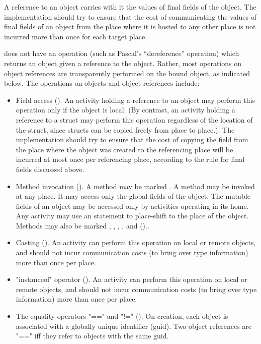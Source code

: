 A reference to an object carries with it the values of final  fields
of the object. The implementation should try to ensure that the cost
of communicating the values of final fields of an object from the
place where it is hosted to any other place is not incurred more than
once for each target place.

{}\Xten{} does not have an operation (such as Pascal's ``dereference''
operation) which returns an object given a reference to the
object. Rather, most operations on object references are transparently
performed on the bound object, as indicated below. The operations on
objects and object references include:
\begin{itemize}

{}\item Field access (). An activity holding a
reference to an object may perform this operation only if the
object is local.  (By contrast, an activity holding a reference to a struct
may perform this operation regardless of the location of the struct, 
since structs can be copied freely from place to place.).  The
implementation should try to ensure that the cost of copying the field
from the place where the object was created to the referencing place
will be incurred at most once per referencing place, according to the
rule for final fields discussed above.

{}\item Method invocation ().  A method may be
marked . A  method may be invoked at any
place. It may access only the global fields of the object. The
mutable fields of an object may be accessed only by activities
operating in its home.  Any activity may use an  statement
to place-shift to the place of the object. Methods may also be
marked , , ,
, and  ()..

{}\item Casting ().  An activity can perform this
operation on local or remote objects, and should not incur
communication costs (to bring over type information) more than once
per place.

{}\item \xcd"instanceof" operator ().  An activity
can perform this operation on local or remote objects, and should not
incur communication costs (to bring over type information) more than
once per place.

\item The equality operators \xcd"==" and \xcd"!="
(). On creation, each object is associated with a globally
unique identifier (guid). Two object references are \xcd"==" iff they refer to objects
with the  same guid.

\end{itemize}

